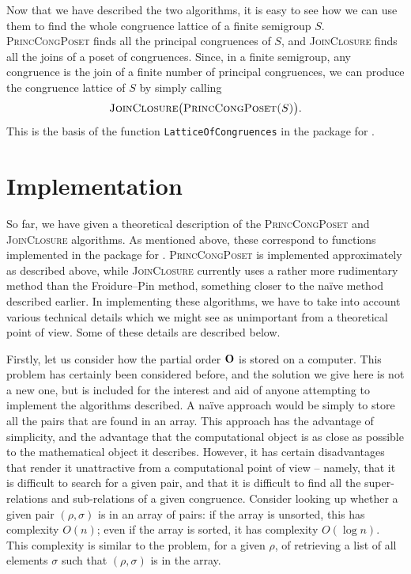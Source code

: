 Now that we have described the two algorithms, it is easy to see how we can use
them to find the whole congruence lattice of a finite semigroup $S$.
\textsc{PrincCongPoset} finds all the principal congruences of $S$, and
\textsc{JoinClosure} finds all the joins of a poset of congruences.  Since, in a
finite semigroup, any congruence is the join of a finite number of principal
congruences, we can produce the congruence lattice of $S$ by simply calling
$$\textsc{JoinClosure\big(PrincCongPoset($S$)\big)}.$$  This is the basis of the
function \texttt{LatticeOfCongruences} in the \Semigroups{} package for \GAP{}
\cite{semigroups}.

\section{Implementation}
\label{sec:lattice-implementation}

So far, we have given a theoretical description of the \textsc{PrincCongPoset}
and \textsc{JoinClosure} algorithms.  As mentioned above, these correspond to
functions implemented in the \Semigroups{} package \cite{semigroups} for \GAP{}
\cite{gap}.  \textsc{PrincCongPoset} is implemented approximately as described
above, while \textsc{JoinClosure} currently uses a rather more rudimentary
method than the Froidure--Pin method, something closer to the na\"ive method
described earlier.  In implementing these algorithms, we have to take into
account various technical details which we might see as unimportant from a
theoretical point of view.  Some of these details are described below.

Firstly, let us consider how the partial order $\mathbf{O}$ is stored on a computer.
This problem has certainly been considered before, and the solution we give here
is not a new one, but is included for the interest and aid of anyone attempting
to implement the algorithms described.  A na\"ive approach would be simply to
store all the pairs that are found in an array.  This approach has the advantage
of simplicity, and the advantage that the computational object is as close as
possible to the mathematical object it describes.  However, it has certain
disadvantages that render it unattractive from a computational point of
view -- namely, that it is difficult to search for a given pair, and that it is
difficult to find all the super-relations and sub-relations of a given
congruence.  Consider looking up whether a given pair $(\rho,\sigma)$ is in an
array of pairs: if the array is unsorted, this has complexity $O(n)$; even if
the array is sorted, it has complexity $O(\log n)$.  This complexity is similar
to the problem, for a given $\rho$, of retrieving a list of all elements
$\sigma$ such that $(\rho, \sigma)$ is in the array.

